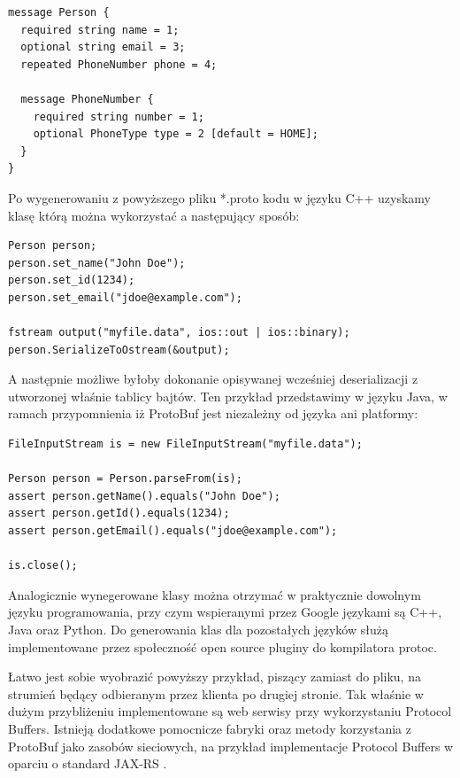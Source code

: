\begin{lstlisting}[label={proto_simple_sam}]
message Person {
  required string name = 1;
  optional string email = 3;
  repeated PhoneNumber phone = 4;

  message PhoneNumber {
    required string number = 1;
    optional PhoneType type = 2 [default = HOME];
  }
}
\end{lstlisting}

Po wygenerowaniu z powyższego pliku *.proto kodu w języku C++ uzyskamy klasę którą można wykorzystać a następujący sposób:

\begin{lstlisting}[caption={Przykład klasy ProtoBuf w C++, serializowanej do pliku}]
Person person;
person.set_name("John Doe");
person.set_id(1234);
person.set_email("jdoe@example.com");

fstream output("myfile.data", ios::out | ios::binary);
person.SerializeToOstream(&output);
\end{lstlisting}

A następnie możliwe byłoby dokonanie opisywanej wcześniej deserializacji z utworzonej właśnie tablicy bajtów.
Ten przykład przedstawimy w języku Java, w ramach przypomnienia iż ProtoBuf jest niezależny od języka ani platformy:

\begin{lstlisting}[caption={Przykład klasy ProtoBuf w C++, odczytującej ,,się'' z zapisanego wcześniej binarnego pliku}]
FileInputStream is = new FileInputStream("myfile.data");

Person person = Person.parseFrom(is);
assert person.getName().equals("John Doe");
assert person.getId().equals(1234);
assert person.getEmail().equals("jdoe@example.com");

is.close();
\end{lstlisting}

Analogicznie wynegerowane klasy można otrzymać w praktycznie dowolnym języku programowania, 
przy czym wspieranymi przez Google językami są C++, Java oraz Python. Do generowania klas dla pozostałych języków
służą implementowane przez społeczność open source pluginy do kompilatora protoc.

Łatwo jest sobie wyobrazić powyższy przykład, piszący zamiast do pliku, na strumień będący odbieranym przez klienta po drugiej stronie.
Tak właśnie w dużym przybliżeniu implementowane są web serwisy przy wykorzystaniu Protocol Buffers. Istnieją dodatkowe pomocnicze fabryki oraz metody
korzystania z ProtoBuf jako zasobów sieciowych, na przykład implementacje Protocol Buffers w oparciu o standard JAX-RS \cite{jaxrs}.


